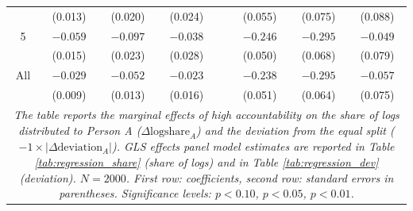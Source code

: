 \documentclass[smallcondensed]{svjour3}
\begin{document}
\begin{table}[ht]
{\begin{tabular}{cccccccc}
                               &  (0.013)                   &  (0.020)                         &  (0.024)                         &   &  (0.055)                 &  (0.075)                           &  (0.088)                         \\
   5                           & $-0.059$\sym{***}          & $-0.097$\sym{***}                & $-0.038$                         &   & $-0.246$\sym{***}        & $-0.295$\sym{***}                  & $-0.049$                         \\
                               &  (0.015)                   &  (0.023)                         &  (0.028)                         &   &  (0.050)                 &  (0.068)                           &  (0.079)                         \\\hline
   All                         & $-0.029$\sym{***}          & $-0.052$\sym{***}                & $-0.023$                         &   & $-0.238$\sym{***}        & $-0.295$\sym{***}                  & $-0.057$                         \\
                               &  (0.009)                   &  (0.013)                         &  (0.016)                         &   &  (0.051)                 &  (0.064)                           &  (0.075)                         \\\hline
\multicolumn{8}{p{12cm}}{\footnotesize{\textit{The table reports the marginal effects of high accountability on the share of logs distributed to Person A ($\Delta\mbox{logshare}_A$) and the deviation from the equal split ($-1\times|\Delta\mbox{deviation}_A|$). GLS effects panel model estimates are reported in Table \ref{tab:regression_share} (share of logs) and in Table \ref{tab:regression_dev} (deviation). $N=2000$. First row: coefficients, second row: standard errors in parentheses. Significance levels: \sym{*} \(p<0.10\), \sym{**} \(p<0.05\), \sym{***} \(p<0.01\).}}}
\end{tabular}
}
\end{table}
%
\clearpage
%
\end{document}

